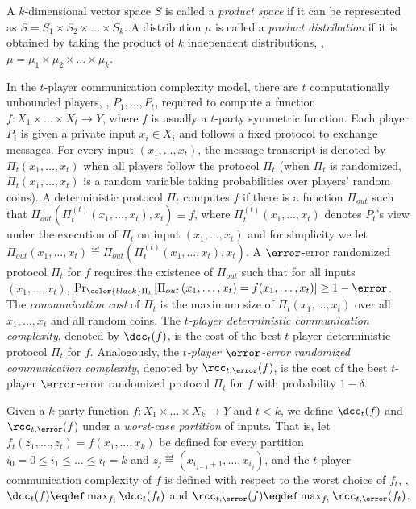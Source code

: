 	A $k$-dimensional vector space $S$ is called a \emph{product space} if it can be represented as $S=S_1\times S_2 \times\dots\times S_k$.
	A distribution $\mu$ is called a \emph{product distribution} if it is obtained by taking the product of $k$ independent distributions, \ie, $\mu=\mu_1\times \mu_2 \times \dots \times \mu_k$.

In the $t$-player communication complexity model, there are $t$ computationally unbounded players, \eg, $P_1,\dots,P_t$, required to compute a function $f:X_1\times\dots\times X_t\to Y$, where $f$ is usually a $t$-party symmetric function.
Each player $P_i$ is given a private input $x_i\in X_i$ and follows a fixed protocol to exchange messages.
For every input $(x_1,\dots,x_t)$, the message transcript is denoted by $\Pi_t(x_1,\dots,x_t)$ when all players follow the protocol $\Pi_t$
(when $\Pi_t$ is randomized, $\Pi_t(x_1,\dots,x_t)$ is a random variable taking probabilities over players' random coins).
A deterministic protocol $\Pi_t$ computes $f$ if there is a function $\Pi_{out}$ such that $\Pi_{out}\left(\Pi_t^{(t)}(x_1,\dots,x_t), x_t\right) \equiv f$,
where $\Pi_t^{(t)}(x_1,\dots,x_t)$ denotes $P_t$'s view under the execution of $\Pi_t$ on input $(x_1,\dots,x_t)$ and for simplicity we let $\Pi_{out}\left(x_1,\dots,x_t\right)\eqdef \Pi_{out}\left(\Pi_t^{(t)}(x_1,\dots,x_t), x_t\right)$.
A $\error$-error randomized protocol $\Pi_t$ for $f$ requires the existence of $\Pi_{out}$ such that for all inputs $(x_1,\dots,x_t)$, $\Pr_{{\color{black}\Pi_t}}\left[ \Pi_{out}\left(x_1,\dots,x_t\right)=f(x_1,\dots,x_t) \right]\ge 1-\error$.
The \emph{communication cost} of $\Pi_t$ is the maximum size of $\Pi_t(x_1,\dots,x_t)$ over all $x_1,\dots,x_t$ and all random coins.
%
%
%
%
%
%
%
%
%
%
%
The \emph{$t$-player deterministic communication complexity},
denoted by $\dcc_t(f)$, is the cost of the 
best $t$-player deterministic protocol 
$\Pi_t$ for $f$.  Analogously, the
\emph{$t$-player $\error$-error randomized communication complexity},
denoted by $\rcc_{t,\error}(f)$, is the cost of the 
best $t$-player $\error$-error randomized protocol 
$\Pi_t$ for $f$ with probability $1-\delta$.    %
%

Given a $k$-party function $f:X_1\times \dots\times X_k\to Y$ and $t<k$, 
we define $\dcc_t(f)$ and $\rcc_{t,\error}(f)$ 
under a \emph{worst-case partition} of inputs.
That is, let $f_t(z_1,\dots,z_t)=f(x_1,\dots,x_k)$ be defined for every partition $i_0=0\le i_1 \le \dots \le i_t=k$ and $z_j\eqdef (x_{i_{j-1}+1},\dots,x_{i_j})$,
and the $t$-player communication complexity of $f$ is defined with respect to the worst choice of $f_t$, \ie,  
$\dcc_t(f)\eqdef\max_{f_t}\dcc_t(f_t)$ and $\rcc_{t,\error}(f)\eqdef \max_{f_t}\rcc_{t,\error}(f_t)$.


